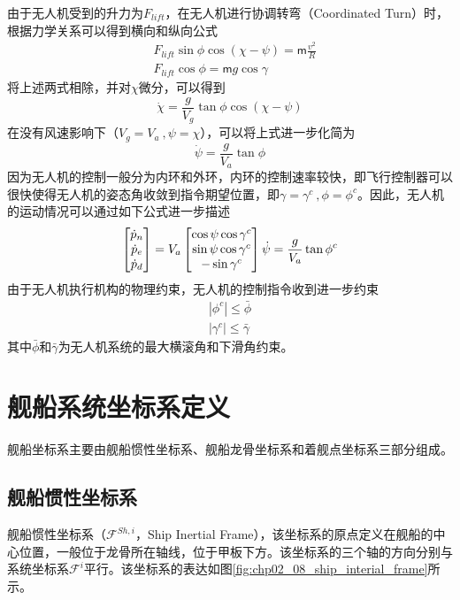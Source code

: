 由于无人机受到的升力为$F_{lift}$，在无人机进行协调转弯（Coordinated Turn）时，根据力学关系可以得到横向和纵向公式
\begin{align}
&F_{lift} \sin \phi \cos (\chi - \psi) = \mathsf{m} \frac{v^2}{R}  \\
&F_{lift } \cos \phi = \mathsf{m} g \cos \gamma
\end{align}
将上述两式相除，并对$\chi$微分，可以得到
\begin{equation}
\dot{\chi} = \frac{g}{V_g} \tan \phi \cos (\chi - \psi)
\end{equation}
在没有风速影响下（$V_g = V_a\ , \psi = \chi$），可以将上式进一步化简为
\begin{equation}
\dot{\psi} =\frac{g}{V_a} \tan \phi
\end{equation}
因为无人机的控制一般分为内环和外环，内环的控制速率较快，即飞行控制器可以很快使得无人机的姿态角收敛到指令期望位置，即$\gamma = \gamma^c\ , \phi = \phi^c$。因此，无人机的运动情况可以通过如下公式进一步描述
\begin{equation}
\begin{bmatrix} \dot{p}_n \\\dot{p}_e \\ \dot{p}_d \end{bmatrix}  = {V}_a \begin{bmatrix} \cos \psi \cos \gamma^c \\ \sin \psi \cos \gamma^c  \\- \sin \gamma^c \end{bmatrix} \\
\dot{\psi} =\frac{g}{V_a} \tan \phi^c
\end{equation}
由于无人机执行机构的物理约束，无人机的控制指令收到进一步约束
\begin{align}
|\phi^c| \le \bar{\phi} \\
|\gamma^c| \le \bar{\gamma}
\end{align}
其中$\bar{\phi}$和$\bar{\gamma}$为无人机系统的最大横滚角和下滑角约束。


\section{舰船系统坐标系定义}

舰船坐标系主要由舰船惯性坐标系、舰船龙骨坐标系和着舰点坐标系三部分组成。
\subsection{舰船惯性坐标系}
舰船惯性坐标系（$\mathcal{F}^{Sh,i}$，Ship Inertial Frame），该坐标系的原点定义在舰船的中心位置，一般位于龙骨所在轴线，位于甲板下方。该坐标系的三个轴的方向分别与系统坐标系$\mathcal{F}^i$平行。该坐标系的表达如图\ref{fig:chp02_08_ship_interial_frame}所示。

